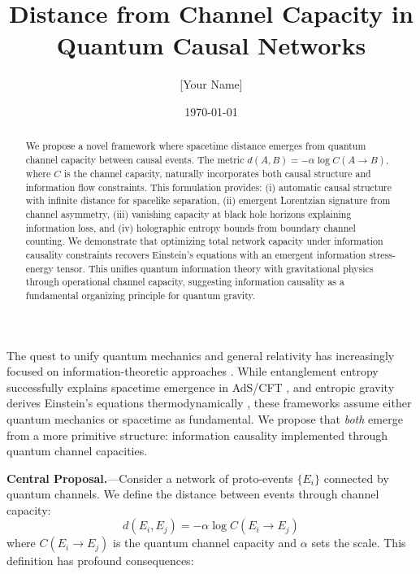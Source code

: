 \documentclass[aps,prl,twocolumn,showpacs,superscriptaddress,groupedaddress]{revtex4-2}
\begin{document}
\title{Distance from Channel Capacity in Quantum Causal Networks}

\author{[Your Name]}

\date{\today}

\begin{abstract}
We propose a novel framework where spacetime distance emerges from quantum channel capacity between causal events. The metric $d(A,B) = -\alpha \log C(A \to B)$, where $C$ is the channel capacity, naturally incorporates both causal structure and information flow constraints. This formulation provides: (i) automatic causal structure with infinite distance for spacelike separation, (ii) emergent Lorentzian signature from channel asymmetry, (iii) vanishing capacity at black hole horizons explaining information loss, and (iv) holographic entropy bounds from boundary channel counting. We demonstrate that optimizing total network capacity under information causality constraints recovers Einstein's equations with an emergent information stress-energy tensor. This unifies quantum information theory with gravitational physics through operational channel capacity, suggesting information causality as a fundamental organizing principle for quantum gravity.
\end{abstract}


\maketitle

The quest to unify quantum mechanics and general relativity has increasingly focused on information-theoretic approaches \cite{VanRaamsdonk2010,Swingle2012}. While entanglement entropy successfully explains spacetime emergence in AdS/CFT \cite{Ryu2006}, and entropic gravity derives Einstein's equations thermodynamically \cite{Verlinde2011,Jacobson1995}, these frameworks assume either quantum mechanics or spacetime as fundamental. We propose that \textit{both} emerge from a more primitive structure: information causality implemented through quantum channel capacities.

\textbf{Central Proposal.}---Consider a network of proto-events $\{E_i\}$ connected by quantum channels. We define the distance between events through channel capacity:
\begin{equation}
d(E_i, E_j) = -\alpha \log C(E_i \to E_j)
\label{eq:distance}
\end{equation}
where $C(E_i \to E_j)$ is the quantum channel capacity and $\alpha$ sets the scale. This definition has profound consequences:
\end{document}
